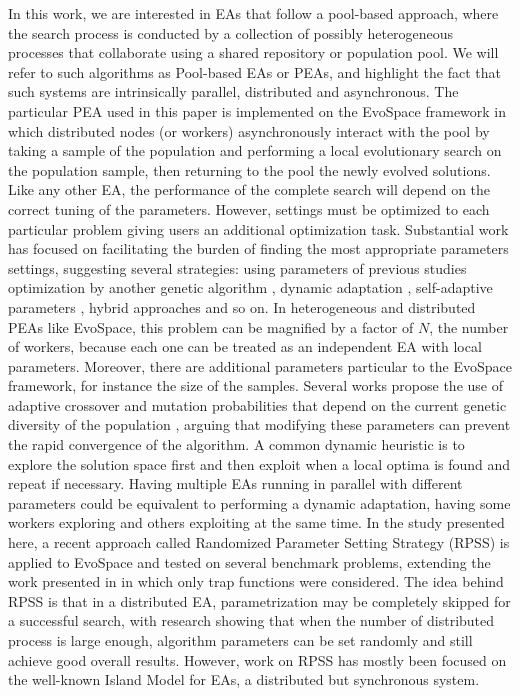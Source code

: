 \documentclass[graybox]{svmult}
\begin{document}
In this work, we are interested in EAs that follow a
pool-based approach, where the search process is conducted by a
collection of possibly heterogeneous processes that collaborate using
a shared repository or population pool. We will refer to such
algorithms as Pool-based EAs or PEAs, and highlight the fact that such
systems are intrinsically parallel, distributed and asynchronous.
The particular PEA used in this paper is implemented on
the EvoSpace framework  \cite{GValdez2015}
in which distributed nodes (or workers) asynchronously interact
with the pool by taking a sample of the population and performing
a local evolutionary search on the population sample, then returning
to the pool the newly evolved solutions.
Like any other EA, the performance of the complete search will depend
on the correct tuning of the parameters. However, settings
must be optimized to each particular problem \cite{de2007parameter}
giving users an additional optimization task.
Substantial work has focused on facilitating the burden of finding
the most appropriate parameters settings, suggesting several strategies:
using parameters of previous studies \cite{eiben1999parameter}
optimization by another genetic algorithm \cite{grefenstette1986optimization},
dynamic adaptation \cite{eiben1999parameter},
self-adaptive parameters \cite{pellerin2004self}, hybrid approaches \cite{de2007parameter} and so on.
In heterogeneous and distributed PEAs like EvoSpace, this problem can
be magnified by a factor of $N$, the number of workers, because each one
can be treated as an independent EA with local parameters. Moreover, there
are additional parameters particular to the EvoSpace framework,
for instance the size of the samples.
Several works propose the use of adaptive crossover and mutation probabilities
that depend on the current genetic diversity of the population \cite{pellerin2004self},
arguing that modifying these parameters can prevent the rapid convergence of the
algorithm.
A common dynamic heuristic is to explore the solution space first and then exploit
when a local optima is found and repeat if necessary.
Having multiple EAs running in parallel with different parameters could be
equivalent to performing a dynamic adaptation, having some workers exploring
and others exploiting at the same time.
In the study presented here, a recent approach called Randomized Parameter
Setting Strategy (RPSS) \cite{fuku1,fuku2} is applied to EvoSpace and tested on
several benchmark problems, extending the work presented in \cite{garcia2014randomized}
in which only trap functions were considered.
The idea behind RPSS is that in a distributed EA, parametrization may be
completely skipped for a successful search, with research showing that when the
number of distributed process is large enough, algorithm parameters can be set
randomly and still achieve good overall results. However, work on RPSS has
mostly been focused on the well-known Island Model for EAs, a distributed but synchronous system.
\end{document}
